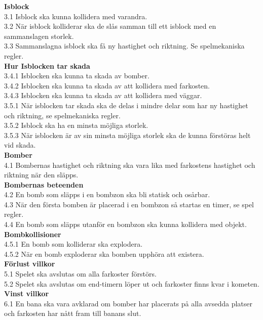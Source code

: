 \documentclass{TDP005mall}
\begin{document}
\textbf{Isblock} \\
3.1 Isblock ska kunna kollidera med varandra. \\
3.2 När isblock kolliderar ska de slås samman till ett isblock med en
sammanslagen storlek. \\ 
3.3 Sammanslagna isblock ska få ny hastighet och riktning.
Se spelmekaniska regler. \\
\textbf{Hur Isblocken tar skada}\\
3.4.1 Isblocken ska kunna ta skada av bomber. \\
3.4.2 Isblocken ska kunna ta skada av att kollidera med farkosten. \\
3.4.3 Isblocken ska kunna ta skada av att kollidera med väggar. \\
3.5.1 När isblocken tar skada ska de delas i mindre delar som har ny
hastighet och riktning, se spelmekaniska regler. \\
3.5.2 Isblock ska ha en minsta möjliga storlek. \\
3.5.3 När isblocken är av sin minsta möjliga storlek ska de kunna förstöras
helt vid skada. \\

\textbf{Bomber}\\
4.1 Bombernas hastighet och riktning ska vara lika med farkostens hastighet
och riktning när den släpps. \\
\textbf{Bombernas beteenden}\\
4.2 En bomb som släpps i en bombzon ska bli statisk och osårbar.\\
4.3 När den första bomben är placerad i en bombzon så startas en timer,
se spel regler.\\
4.4 En bomb som släpps utanför en bombzon ska kunna kollidera med objekt.\\
\textbf{Bombkollisioner}\\
4.5.1 En bomb som kolliderar ska explodera.\\
4.5.2 När en bomb exploderar ska bomben upphöra att existera. \\

\textbf{Förlust villkor} \\
5.1 Spelet ska avslutas om alla farkoster förstörs.\\
5.2 Spelet ska avslutas om end-timern löper ut och farkoster finns kvar i kometen.\\

\textbf{Vinst villkor} \\
6.1 En bana ska vara avklarad om bomber har placerats på alla avsedda platser
och farkosten har nått fram till banans slut.\\
\end{document}
